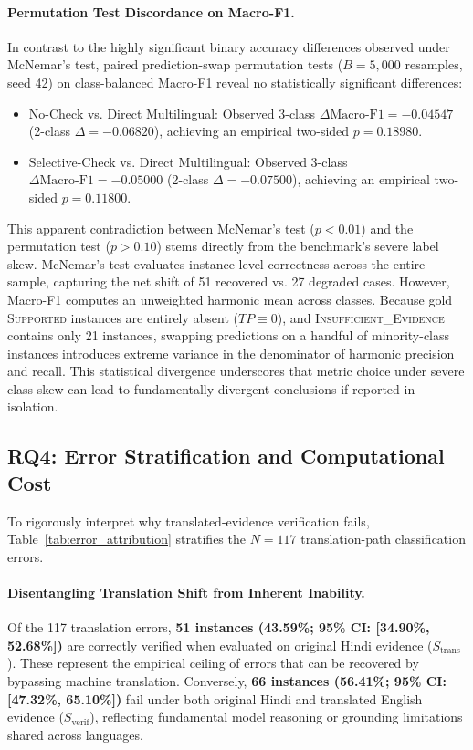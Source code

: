 \paragraph{Permutation Test Discordance on Macro-F1.}
In contrast to the highly significant binary accuracy differences observed under McNemar's test, paired prediction-swap permutation tests ($B=5,000$ resamples, seed 42) on class-balanced Macro-F1 reveal no statistically significant differences:
\begin{itemize}
    \item No-Check vs. Direct Multilingual: Observed 3-class $\Delta \text{Macro-F1} = -0.04547$ (2-class $\Delta = -0.06820$), achieving an empirical two-sided \textbf{$p = 0.18980$}.
    \item Selective-Check vs. Direct Multilingual: Observed 3-class $\Delta \text{Macro-F1} = -0.05000$ (2-class $\Delta = -0.07500$), achieving an empirical two-sided \textbf{$p = 0.11800$}.
\end{itemize}

This apparent contradiction between McNemar's test ($p < 0.01$) and the permutation test ($p > 0.10$) stems directly from the benchmark's severe label skew. McNemar's test evaluates instance-level correctness across the entire sample, capturing the net shift of 51 recovered vs. 27 degraded cases. However, Macro-F1 computes an unweighted harmonic mean across classes. Because gold \textsc{Supported} instances are entirely absent ($TP \equiv 0$), and \textsc{Insufficient\_Evidence} contains only 21 instances, swapping predictions on a handful of minority-class instances introduces extreme variance in the denominator of harmonic precision and recall. This statistical divergence underscores that metric choice under severe class skew can lead to fundamentally divergent conclusions if reported in isolation.

\subsection{RQ4: Error Stratification and Computational Cost}
To rigorously interpret why translated-evidence verification fails, Table~\ref{tab:error_attribution} stratifies the $N=117$ translation-path classification errors.



\paragraph{Disentangling Translation Shift from Inherent Inability.}
Of the 117 translation errors, \textbf{51 instances (43.59\%; 95\% CI: [34.90\%, 52.68\%])} are correctly verified when evaluated on original Hindi evidence ($S_{\text{trans}}$). These represent the empirical ceiling of errors that can be recovered by bypassing machine translation. Conversely, \textbf{66 instances (56.41\%; 95\% CI: [47.32\%, 65.10\%])} fail under both original Hindi and translated English evidence ($S_{\text{verif}}$), reflecting fundamental model reasoning or grounding limitations shared across languages.

